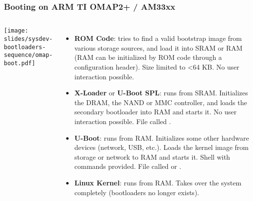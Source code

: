 \begin{frame}
\frametitle{Booting on ARM TI OMAP2+ / AM33xx}
  \begin{columns}
    \texttt{[image: slides/sysdev-bootloaders-sequence/omap-boot.pdf]}
    \footnotesize
    \begin{itemize}
    \item {\bf ROM Code}: tries to find a valid bootstrap image from
      various storage sources, and load it into SRAM or RAM (RAM can
      be initialized by ROM code through a configuration header). Size
      limited to \textless 64 KB. No user interaction possible.
    \item {\bf X-Loader} or {\bf U-Boot SPL}: runs from SRAM. Initializes
      the DRAM, the NAND or MMC controller, and loads the secondary
      bootloader into RAM and starts it. No user interaction
      possible. File called .
    \item {\bf U-Boot}: runs from RAM. Initializes some other hardware
      devices (network, USB, etc.).  Loads the kernel image from
      storage or network to RAM and starts it. Shell with commands
      provided. File called  or .
    \item {\bf Linux Kernel}: runs from RAM. Takes over the system
      completely (bootloaders no longer exists).
    \end{itemize}
  \end{columns}
\end{frame}

